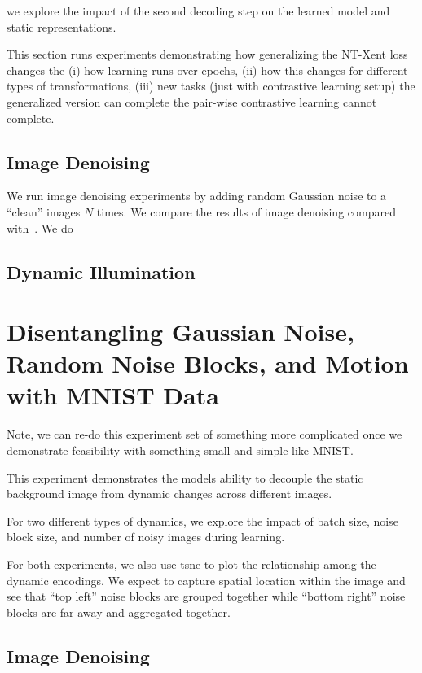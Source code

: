 \documentclass[11pt]{article}
\begin{document}
we explore the impact of the second decoding step on the learned model and static representations.

This section runs experiments demonstrating how generalizing the NT-Xent loss changes the (i) how learning runs over epochs, (ii) how this changes for different types of transformations, (iii) new tasks (just with contrastive learning setup) the generalized version can complete the pair-wise contrastive learning cannot complete.



\subsection{Image Denoising}\label{subsec:gnt_xent_denoising}

We run image denoising experiments by adding random Gaussian noise to a ``clean'' images $N$ times. We compare the results of image denoising compared with~\cite{xia2019training,metzler2016denoising,li2013efficient}. We do 

\subsection{Dynamic Illumination}\label{subsec:gnt_xent_illumination}

\section{Disentangling Gaussian Noise, Random Noise Blocks, and Motion with MNIST Data}\label{sec:disent_mnist}

Note, we can re-do this experiment set of something more complicated once we demonstrate feasibility with something small and simple like MNIST.

This experiment demonstrates the models ability to decouple the static background image from dynamic changes across different images.

For two different types of dynamics, we explore the impact of batch size, noise block size, and number of noisy images during learning.

For both experiments, we also use tsne to plot the relationship among the dynamic encodings. We expect to capture spatial location within the image and see that ``top left'' noise blocks are grouped together while ``bottom right'' noise blocks are far away and aggregated together.


\subsection{Image Denoising}\label{subsec:disent_mnist_denoising}
\end{document}
